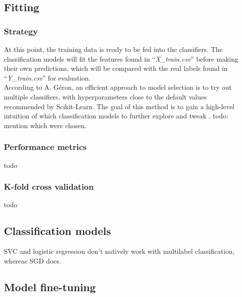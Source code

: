 \documentclass[letterpaper,12pt]{article}
\begin{document}

\subsection{Fitting}

\subsubsection{Strategy}

At this point, the training data is ready to be fed into the classifiers. The classification models will fit the features found in ``\textit{X\_train.csv}'' before making their own predictions, which will be compared with the real labels found in ``\textit{Y\_train.csv}'' for evaluation.\\

According to A. Géron, an efficient approach to model selection is to try out multiple classifiers, with hyperparameters close to the default values recommended by Scikit-Learn. The goal of this method is to gain a high-level intuition of which classification models to further explore and tweak \cite{Geron2019}. todo: mention which were chosen.





\subsubsection{Performance metrics}

todo

\subsubsection{K-fold cross validation}

todo

\subsection{Classification models}

SVC and logistic regression  don't natively work with multilabel classification, whereas SGD does.

\subsection{Model fine-tuning}
\end{document}
